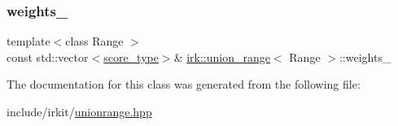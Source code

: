 \mbox{\label{classirk_1_1union__range_ad593ed1dc96a2caf524511cb3833910c}} 
\subsubsection{\texorpdfstring{weights\+\_\+}{weights\_}}
{\footnotesize\ttfamily template$<$class Range $>$ \\
const std\+::vector$<$\mbox{\hyperlink{classirk_1_1union__range_af728218b976df464ebb051a9e5358e93}{score\+\_\+type}}$>$\& \mbox{\hyperlink{classirk_1_1union__range}{irk\+::union\+\_\+range}}$<$ Range $>$\+::weights\+\_\+\hspace{0.3cm}{\ttfamily [protected]}}



The documentation for this class was generated from the following file\+:\begin{DoxyCompactItemize}
\item 
include/irkit/\mbox{\hyperlink{unionrange_8hpp}{unionrange.\+hpp}}\end{DoxyCompactItemize}

